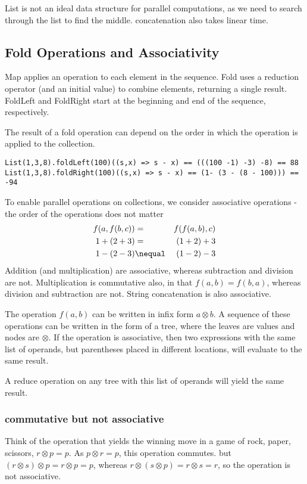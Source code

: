 List is not an ideal data structure for parallel computations, as we need to search through the list to find the middle. concatenation also takes linear time.

\subsection{Fold Operations and Associativity}

Map applies an operation to each element in the sequence. Fold uses a reduction operator (and an initial value) to combine elements, returning a single result. FoldLeft and FoldRight start at the beginning and end of the sequence, respectively. 

The result of a fold operation can depend on the order in which the operation is applied to the collection. 
\begin{lstlisting}
List(1,3,8).foldLeft(100)((s,x) => s - x) == (((100 -1) -3) -8) == 88
List(1,3,8).foldRight(100)((s,x) => s - x) == (1- (3 - (8 - 100))) == -94
\end{lstlisting}

To enable parallel operations on collections, we consider associative operations - the order of the operations does not matter
\begin{eqnarray*}
f(a,f(b,c)) & = & f(f(a,b),c) \\
1 + (2 + 3) & = & (1 + 2) + 3 \\
1 - (2 -3) & \nequal & (1 -2) -3 \\
\end{eqnarray*}
Addition (and multiplication) are associative, whereas subtraction and division are not. Multiplication is commutative also, in that $ f(a,b) = f(b,a)$, whereas division and subtraction are not. String concatenation is also associative.

The operation $f(a,b)$ can be written in infix form $ a \otimes b$. A sequence of these operations can be written in the form of a tree, where the leaves are values and nodes are $\otimes$. If the operation is associative, then two expressions with the same list of operands, but parentheses placed in different locations, will evaluate to the same result. 

A reduce operation on any tree with this list of operands will yield the same result.

\subsubsection{commutative but not associative} Think of the operation that yields the winning move in a game of rock, paper, scissors, $r \otimes p = p$. As $p \otimes r = p$, this operation commutes. but $ (r \otimes s) \otimes p = r \otimes p = p$, whereas $r \otimes (s \otimes p) = r \otimes s = r$, so the operation is not associative.

